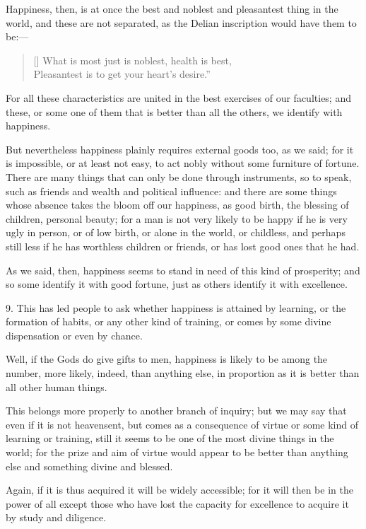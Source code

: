 Happiness, then, is at once the best and noblest and pleasantest thing
in the world, and these are not separated, as the Delian inscription
would have them to be:---

\settowidth{}
\begin{verse}[\versewidth]
What is most just is noblest, health is best,\\
Pleasantest is to get your heart's desire.''
\end{verse}

\noindent For all these characteristics are united in the best
exercises of our faculties; and these, or some one of them that is
better than all the others, we identify with happiness.

But nevertheless happiness plainly requires external goods too, as we
said; for it is impossible, or at least not easy, to act nobly without
some furniture of fortune. There are many things that can only be done
through instruments, so to speak, such as friends and wealth and
political influence: and there are some things whose absence takes the
bloom off our happiness, as good birth, the blessing of children,
personal beauty; for a man is not very likely to be happy if he is
very ugly in person, or of low birth, or alone in the world, or
childless, and perhaps still less if he has worthless children or
friends, or has lost good ones that he had.

As we said, then, happiness seems to stand in need of this kind of
prosperity; and so some identify it  with good fortune, just
as others identify it with excellence.

9. This has led people to ask whether happiness is attained by
learning, or the formation of habits, or any other kind of training,
or comes by some divine dispensation or even by chance.

Well, if the Gods do give gifts to men, happiness is likely to be
among the number, more likely, indeed, than anything else, in
proportion as it is better than all other human things.

This belongs more properly to another branch of inquiry; but we may
say that even if it is not heavensent, but comes as a consequence of
virtue or some kind of learning or training, still it seems to be one
of the most divine things in the world; for the prize and aim of
virtue would appear to be better than anything else and something
divine and blessed.

Again, if it is thus acquired it will be widely accessible; for it
will then be in the power of all except those who have lost the
capacity for excellence to acquire it by study and diligence.

